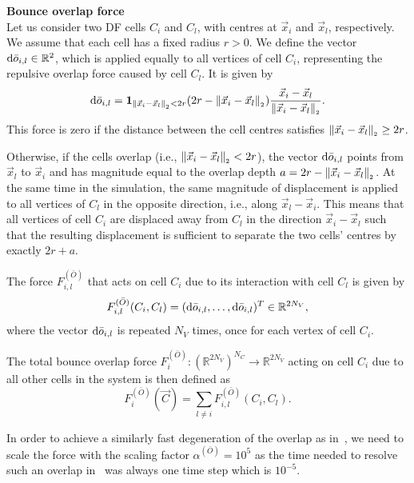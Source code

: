 \begin{definition}\textbf{Bounce overlap force} \\
	Let us consider two DF cells $C_i$ and $C_l$, with centres at $\vec{x}_i$ and $\vec{x}_l$, respectively. 
	We assume that each cell has a fixed radius $r > 0$.
	We define the vector $\mathrm{d} \bar{o}_{i,l} \in \mathbb{R}^2$, which is applied equally to all vertices of cell $C_i$, representing the repulsive overlap force caused by cell $C_l$. 
	It is given by
	\[
	\dequ \bar{o}_{i,l} = \mathbf{1}_{\norm[\vec{x}_i - \vec{x}_l] < 2r} (2r - \norm[\vec{x}_i - \vec{x}_l]) \dfrac{\vec{x}_i - \vec{x}_l}{\norm[\vec{x}_i - \vec{x}_l]}.
	\]
	This force is zero if the distance between the cell centres satisfies $\norm[\vec{x}_i - \vec{x}_l] \geq 2r$.

	Otherwise, if the cells overlap (i.e., $\norm[\vec{x}_i - \vec{x}_l] < 2r$), the vector $\mathrm{d} \bar{o}_{i,l}$ points from $\vec{x}_l$ to $\vec{x}_i$ and has magnitude equal to the overlap depth $a = 2r - \norm[\vec{x}_i - \vec{x}_l]$. 
	At the same time in the simulation, the same magnitude of displacement is applied to all vertices of $C_l$ in the opposite direction, i.e., along $\vec{x}_l - \vec{x}_i$.
	This means that all vertices of cell $C_i$ are displaced away from $C_l$ in the direction $\vec{x}_i - \vec{x}_l$ such that the resulting displacement is sufficient to separate the two cells' centres by exactly $2r + a$. 

	The force $F^{(\bar{O})}_{i,l}$ that acts on cell $C_i$ due to its interaction with cell $C_l$ is given by
	\[
	F^{(\bar{O})}_{i,l}(C_i, C_l) =  (\mathrm{d} \bar{o}_{i,l}, \ldots, \mathrm{d} \bar{o}_{i,l})^T \in \mathbb{R}^{2N_V},
	\]
	where the vector $\mathrm{d} \bar{o}_{i,l}$ is repeated $N_V$ times, once for each vertex of cell $C_i$.

	The total bounce overlap force $F^{(\bar{O})}_i: (\mathbb{R}^{2N_V})^{N_C} \rightarrow \mathbb{R}^{2N_V}$ acting on cell $C_i$ due to all other cells in the system is then defined as
	\[
	F^{(\bar{O})}_i(\vec{C}) = \sum\limits_{l \neq i} F^{(\bar{O})}_{i,l}(C_i, C_l).
	\]

\end{definition}
In order to achieve a similarly fast degeneration of the overlap as in~\cite{Bruna2012}, we need to scale the force with the scaling factor 
\(
\alpha^{(\bar{O})} = 10^5
\)
as the time needed to resolve such an overlap in~\cite{Bruna2012} was always one time step which is $10^{-5}$. 

